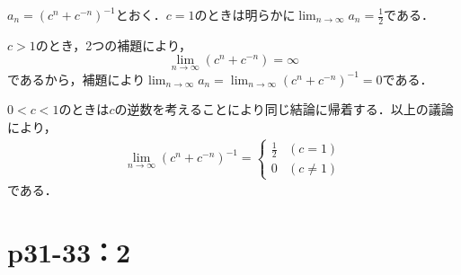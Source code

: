 \documentclass[a4paper,10pt,fleqn]{ltjsarticle}
\begin{document}
\begin{tleftbar}
    $a_n = (c^n +c^{-n})^{-1}$とおく．$c=1$のときは明らかに$\lim_{n \to \infty} a_n =\frac{1}{2}$である．

    $c>1$のとき，2つの補題により，
    \[
        \lim_{n \to \infty} (c^n + c^{-n}) = \infty
    \]
    であるから，補題により$\lim_{n \to \infty} a_n = \lim_{n \to \infty} (c^n +c^{-n})^{-1} =0$である．

    $0<c<1$のときは$c$の逆数を考えることにより同じ結論に帰着する．以上の議論により，
    \begin{align*}
        \lim_{n \to \infty} (c^n +c^{-n})^{-1} =
        \begin{cases}
            \frac{1}{2}&(c=1)\\
            0 & (c \ne 1)
        \end{cases}
    \end{align*}
    である．
\end{tleftbar}


\section*{p31-33：2}
\end{document}
